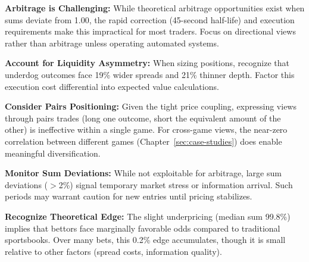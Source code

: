 \textbf{Arbitrage is Challenging:} While theoretical arbitrage opportunities exist when sums deviate from 1.00, the rapid correction (45-second half-life) and execution requirements make this impractical for most traders. Focus on directional views rather than arbitrage unless operating automated systems.

\textbf{Account for Liquidity Asymmetry:} When sizing positions, recognize that underdog outcomes face 19\% wider spreads and 21\% thinner depth. Factor this execution cost differential into expected value calculations.

\textbf{Consider Pairs Positioning:} Given the tight price coupling, expressing views through pairs trades (long one outcome, short the equivalent amount of the other) is ineffective within a single game. For cross-game views, the near-zero correlation between different games (Chapter~\ref{sec:case-studies}) does enable meaningful diversification.

\textbf{Monitor Sum Deviations:} While not exploitable for arbitrage, large sum deviations ($>$2\%) signal temporary market stress or information arrival. Such periods may warrant caution for new entries until pricing stabilizes.

\textbf{Recognize Theoretical Edge:} The slight underpricing (median sum 99.8\%) implies that bettors face marginally favorable odds compared to traditional sportsbooks. Over many bets, this 0.2\% edge accumulates, though it is small relative to other factors (spread costs, information quality).
